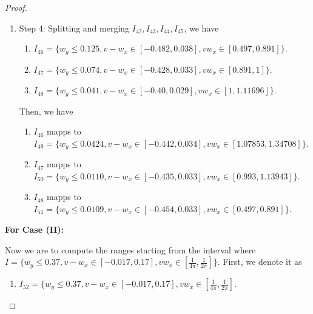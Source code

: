 \documentclass{article}
\theoremstyle{plain}
\theoremstyle{remark}
\begin{document}
\begin{proof}
\begin{enumerate}
\begin{enumerate}
\begin{enumerate}
                \item $I_{38}$ mapps to \\ $I_{42} = \{w_y\le 0.0404, v-w_x\in[-0.392, 0.029], vw_x \in[0.888, 1.11696]\}$.
                \item $I_{39}$ mapps to \\ $I_{43} = \{w_y\le 0.0740, v-w_x\in[-0.428, 0.033], vw_x \in[0.741, 1]\}$.
                \item $I_{40}$ mapps to \\ $I_{44} = \{w_y\le 0.125, v-w_x\in[-0.482, 0.038], vw_x \in[0.497, 0.891]\}$.
                \item $I_{41}$ mapps to \\ $I_{45} = \{w_y\le 0.109, v-w_x\in[-0.400, 0.038], vw_x \in[0.534, 0.702]\}$.
            \end{enumerate}
        \item Step 4: Splitting and merging $I_{42},I_{43},I_{44},I_{45}$, we have
            \begin{enumerate}
                \item $I_{46}=\{w_y\le 0.125, v-w_x\in[-0.482, 0.038], vw_x \in[0.497, 0.891]\}$.
                \item $I_{47}=\{w_y\le 0.074, v-w_x\in[-0.428, 0.033], vw_x \in[0.891, 1]\}$.
                \item $I_{48}=\{w_y\le 0.041, v-w_x\in[-0.40, 0.029], vw_x \in[1, 1.11696]\}$.
            \end{enumerate}
            Then, we have 
            \begin{enumerate}
                \item $I_{46}$ mapps to \\ $I_{49} = \{w_y\le 0.0424, v-w_x\in[-0.442, 0.034], vw_x \in[1.07853, 1.34708]\}$.
                \item $I_{47}$ mapps to \\ $I_{50} = \{w_y\le 0.0110, v-w_x\in[-0.435, 0.033], vw_x \in[0.993, 1.13943]\}$.
                \item $I_{48}$ mapps to \\ $I_{51} = \{w_y\le 0.0109, v-w_x\in[-0.454, 0.033], vw_x \in[0.497, 0.891]\}$.
            \end{enumerate}
    \end{enumerate}
\end{enumerate}

\textbf{For Case (II):}

Now we are to compute the ranges starting from the interval where $I=\{w_y\le 0.37, v-w_x\in[-0.017, 0.17], vw_x \in[\frac{1}{4\pi}, \frac{1}{2\pi}]\}$. First, we denote it as
\begin{enumerate}
    \item $I_{52}=\{w_y\le 0.37, v-w_x\in[-0.017, 0.17], vw_x \in[\frac{1}{4\pi}, \frac{1}{2\pi}]$.
\end{enumerate}


\end{proof}
\end{document}
